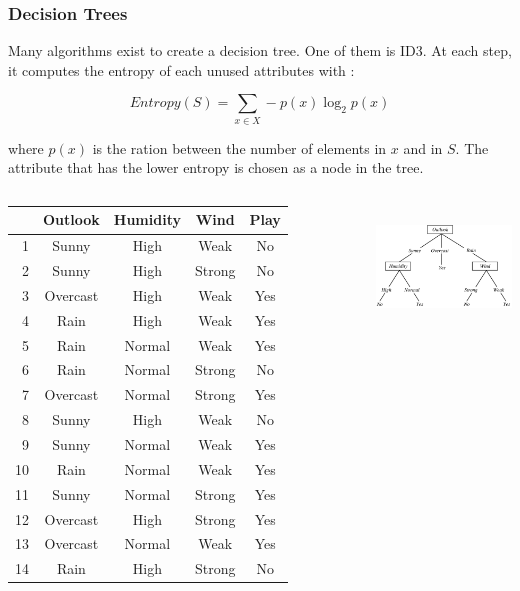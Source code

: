 \documentclass{beamer}
\begin{document}
\begin{frame}
\frametitle{Decision Trees}
  Many algorithms exist to create a decision tree. One of them is ID3. At each
  step, it computes the entropy of each unused attributes  with :

  \begin{equation*}
    Entropy(S) = \sum_{x \in X} -p(x) \log_{2}p(x)
  \end{equation*}

  where $p(x)$ is the ration between the number of elements in $x$ and in $S$.
  The attribute that has the lower entropy is chosen as a node in the tree.

  \begin{columns}
    \begin{table}[htb]
      \centering
      \tiny
        \begin{tabular}{@{}rcccc@{}}
        \cmidrule{2-5}
           & Outlook  & Humidity & Wind   & Play\\
        \midrule
        1  & Sunny    & High     & Weak   & No  \\
        2  & Sunny    & High     & Strong & No  \\
        3  & Overcast & High     & Weak   & Yes \\
        4  & Rain     & High     & Weak   & Yes \\
        5  & Rain     & Normal   & Weak   & Yes \\
        6  & Rain     & Normal   & Strong & No  \\
        7  & Overcast & Normal   & Strong & Yes \\
        8  & Sunny    & High     & Weak   & No  \\
        9  & Sunny    & Normal   & Weak   & Yes \\
        10 & Rain     & Normal   & Weak   & Yes \\
        11 & Sunny    & Normal   & Strong & Yes \\
        12 & Overcast & High     & Strong & Yes \\
        13 & Overcast & Normal   & Weak   & Yes \\
        14 & Rain     & High     & Strong & No  \\
        \bottomrule
      \end{tabular}
      \normalsize
    \end{table}

      \centering
      \includegraphics[height=3.2cm]{img/id3.png}
  \end{columns}
\end{frame}
\end{document}
